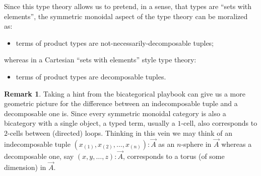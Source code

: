 \documentclass[pra,floatfix,
amsmath,superscriptaddress, 12pt]{article}
\theoremstyle{definition}
\newtheorem*{remark}{Remark}
\begin{document}
Since this type theory allows us to pretend, in a sense, that types are ``sets with elements'', the symmetric monoidal aspect of the type theory can be moralized as:
\begin{itemize}
    \item terms of product types are not-necessarily-decomposable tuples;
\end{itemize}
whereas in a Cartesian ``sets with elements'' style type theory:
\begin{itemize}
    \item terms of product types are decomposable tuples.
\end{itemize}

\begin{remark}
Taking a hint from the bicategorical playbook can give us a more geometric picture for the difference between an indecomposable tuple and a decomposable one is. Since every symmetric monoidal category is also a bicategory with a single object, a typed term, usually a $1$-cell, also corresponds to $2$-cells between (directed) loops. Thinking in this vein we may think of an indecomposable tuple $(x_{(1)},x_{(2)},\dots,x_{(n)}):\overrightarrow{A}$ as an $n$-sphere in $\overrightarrow{A}$ whereas a decomposable one, say $(x,y,\dots,z):\overrightarrow{A}$, corresponds to a torus (of some dimension) in  $\overrightarrow{A}$.
\end{remark}







\end{document}

